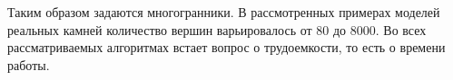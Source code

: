 \documentclass[a4paper,12pt, titlepage]{article}
\begin{document}
\begin{flushleft}
 Таким образом задаются многогранники. В рассмотренных примерах моделей реальных камней количество
вершин варьировалось от 80 до 8000. Во всех рассматриваемых алгоритмах встает вопрос о 
трудоемкости, то есть о времени работы.
\end{flushleft}
\end{document}
